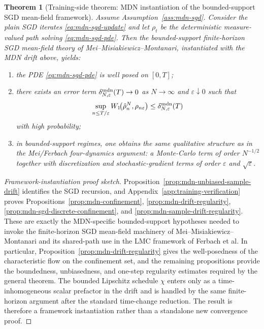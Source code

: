 \documentclass[11pt]{article}
\newtheorem{theorem}{Theorem}
\theoremstyle{definition}
\begin{document}
\begin{theorem}[Training-side theorem: MDN instantiation of the bounded-support SGD mean-field framework]
\label{thm:mdn-sgd-mean-field}
Assume Assumption~\ref{ass:mdn-sgd}. Consider the plain SGD iterates
\eqref{eq:mdn-sgd-update} and let $\rho_t$ be the deterministic measure-valued
path solving \eqref{eq:mdn-sgd-pde}. Then the bounded-support finite-horizon SGD
mean-field theory of Mei--Misiakiewicz--Montanari, instantiated with the MDN
drift above, yields:
\begin{enumerate}[label=(\roman*)]
  \item the PDE \eqref{eq:mdn-sgd-pde} is well posed on $[0,T]$;
  \item there exists an error term
  $\delta_{N,\varepsilon}^{\rm mdn}(T)\to 0$ as $N\to\infty$ and
  $\varepsilon\downarrow 0$ such that
  \[
    \sup_{n\le T/\varepsilon}
    W_1\!\bigl(\hat\rho_n^N,\rho_{n\varepsilon}\bigr)
    \le
    \delta_{N,\varepsilon}^{\rm mdn}(T)
  \]
  with high probability;
  \item in bounded-support regimes, one obtains the same qualitative structure
  as in the Mei/Ferbach four-dynamics argument: a Monte-Carlo term of order
  $N^{-1/2}$ together with discretization and stochastic-gradient terms of
  order $\varepsilon$ and $\sqrt{\varepsilon}$.
\end{enumerate}
\end{theorem}

\begin{proof}[Framework-instantiation proof sketch]
Proposition~\ref{prop:mdn-unbiased-sample-drift} identifies the SGD recursion,
and Appendix~\ref{app:training-verification} proves
Propositions~\ref{prop:mdn-confinement},
\ref{prop:mdn-drift-regularity},
\ref{prop:mdn-sgd-discrete-confinement}, and
\ref{prop:mdn-sample-drift-regularity}. These are exactly the MDN-specific
bounded-support hypotheses needed to invoke the finite-horizon SGD mean-field
machinery of Mei--Misiakiewicz--Montanari and its shared-path use in the LMC
framework of Ferbach et al. In particular,
Proposition~\ref{prop:mdn-drift-regularity} gives the well-posedness of the
characteristic flow on the confinement set, and the remaining propositions
provide the boundedness, unbiasedness, and one-step regularity estimates
required by the general theorem. The bounded Lipschitz schedule $\chi$ enters
only as a time-inhomogeneous scalar prefactor in the drift and is handled by the
same finite-horizon argument after the standard time-change reduction. The
result is therefore a framework instantiation rather than a standalone new
convergence proof.
\end{proof}
\end{document}
